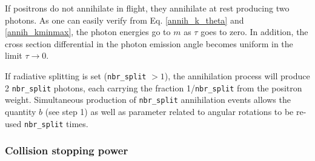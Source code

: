 If positrons do not annihilate in flight, they
annihilate at rest producing two photons. As one can easily
verify from Eq. \eqref{annih_k_theta} and \eqref{annih_kminmax},
the photon energies go to $m$ as $\tau$ goes to zero.
In addition, the cross section differential in the
photon emission angle becomes uniform in the limit $\tau \to 0$.

If radiative splitting is set ({\tt nbr\_split} $> 1$),
the annihilation process will produce 2 {\tt nbr\_split} photons,
each carrying the fraction 1/{\tt nbr\_split} from the positron weight.
Simultaneous production of {\tt nbr\_split} annihilation
events allows the quantity $b$ (see step 1) as well as
parameter related to angular rotations to be re-used
{\tt nbr\_split} times.

\subsubsection{Collision stopping power}
\label{stopping_power}
\setcounter{equation}{0}


